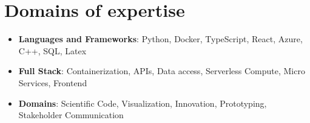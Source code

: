 \documentclass[]{friggeri-cv}
\begin{document}
\section{Domains of expertise}
\begin{itemize} 
	\item {\large\textbf{\textcolor{pblue}{Languages and Frameworks}}}: Python, Docker, TypeScript, React, Azure, C++, SQL, Latex
	\item {\large\textbf{\textcolor{pblue}{Full Stack}}}: Containerization, APIs, Data access, Serverless Compute, Micro Services, Frontend
	\item {\large\textbf{\textcolor{pblue}{Domains}}}: Scientific Code, Visualization, Innovation, Prototyping, Stakeholder Communication
\end{itemize}

\vspace*{\fill}
\end{document}
